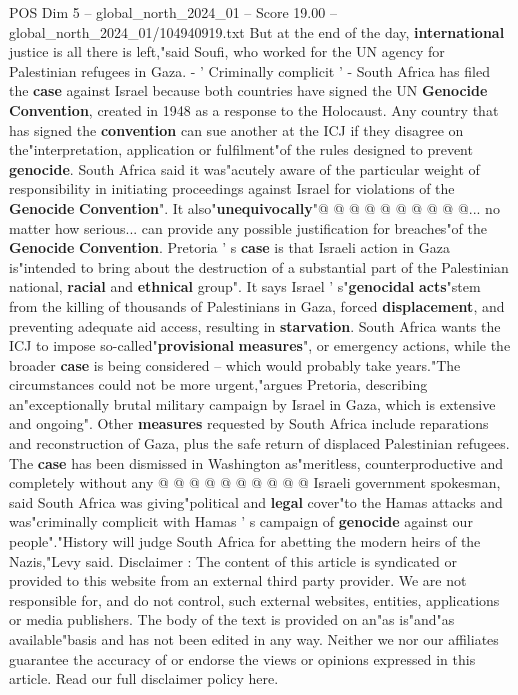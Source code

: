 \begin{textsample}{POS Dim 5 – global\_north\_2024\_01 – Score 19.00 – global\_north\_2024\_01/104940919.txt}
But at the end of the day, \textbf{international} justice is all there is left,"said Soufi, who worked for the UN agency for Palestinian refugees in Gaza. - ' Criminally complicit ' - South Africa has filed the \textbf{case} against Israel because both countries have signed the UN \textbf{Genocide} \textbf{Convention}, created in 1948 as a response to the Holocaust.
Any country that has signed the \textbf{convention} can sue another at the ICJ if they disagree on the"interpretation, application or fulfilment"of the rules designed to prevent \textbf{genocide}.
South Africa said it was"acutely aware of the particular weight of responsibility in initiating proceedings against Israel for violations of the \textbf{Genocide} \textbf{Convention}".
It also"\textbf{unequivocally}"@ @ @ @ @ @ @ @ @ @... no matter how serious... can provide any possible justification for breaches"of the \textbf{Genocide} \textbf{Convention}.
Pretoria ' s \textbf{case} is that Israeli action in Gaza is"intended to bring about the destruction of a substantial part of the Palestinian national, \textbf{racial} and \textbf{ethnical} group".
It says Israel ' s"\textbf{genocidal} \textbf{acts}"stem from the killing of thousands of Palestinians in Gaza, forced \textbf{displacement}, and preventing adequate aid access, resulting in \textbf{starvation}.
South Africa wants the ICJ to impose so-called"\textbf{provisional} \textbf{measures}", or emergency actions, while the broader \textbf{case} is being considered -- which would probably take years."The circumstances could not be more urgent,"argues Pretoria, describing an"exceptionally brutal military campaign by Israel in Gaza, which is extensive and ongoing".
Other \textbf{measures} requested by South Africa include reparations and reconstruction of Gaza, plus the safe return of displaced Palestinian refugees.
The \textbf{case} has been dismissed in Washington as"meritless, counterproductive and completely without any @ @ @ @ @ @ @ @ @ @ Israeli government spokesman, said South Africa was giving"political and \textbf{legal} cover"to the Hamas attacks and was"criminally complicit with Hamas ' s campaign of \textbf{genocide} against our people"."History will judge South Africa for abetting the modern heirs of the Nazis,"Levy said.
Disclaimer : The content of this article is syndicated or provided to this website from an external third party provider.
We are not responsible for, and do not control, such external websites, entities, applications or media publishers.
The body of the text is provided on an"as is"and"as available"basis and has not been edited in any way.
Neither we nor our affiliates guarantee the accuracy of or endorse the views or opinions expressed in this article.
Read our full disclaimer policy here.

\end{textsample}
